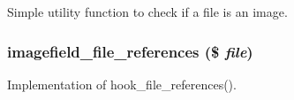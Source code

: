 Simple utility function to check if a file is an image. \hypertarget{imagefield__file_8inc_12ca7ad4f9d02d9338d517f494e8883c}{
\subsubsection[{imagefield\_\-file\_\-references}]{\setlength{\rightskip}{0pt plus 5cm}imagefield\_\-file\_\-references (\$ {\em file})}}
\label{imagefield__file_8inc_12ca7ad4f9d02d9338d517f494e8883c}


Implementation of hook\_\-file\_\-references(). 